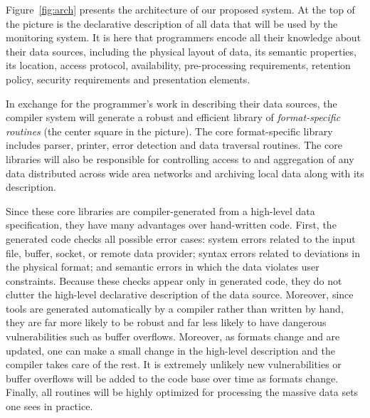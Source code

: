 \documentclass{sigplanconf}
\begin{document}
Figure~\ref{fig:arch} presents the architecture of our proposed
system.  At the top of the picture is the declarative description of all
data that will be used by the monitoring system.  It is here that
programmers encode all their knowledge about their data sources,
including the physical layout of data, its semantic properties,
its location, access protocol, availability, pre-processing requirements,
retention policy, security requirements and presentation elements.

In exchange for the programmer's work in describing their
data sources, the compiler system will generate
a robust and efficient library of {\em format-specific routines} (the center
square in the picture).
The core format-specific 
library includes parser, printer, error detection and data traversal
routines.  The core libraries will also be responsible for controlling
access to and aggregation of any data distributed across wide area
networks and archiving local data along with its description.  

Since these core libraries are compiler-generated from a
high-level data specification, they have many advantages over
hand-written code.  First, the generated code checks
all possible error cases: system errors related to the input file,
buffer, socket, or remote data provider; 
syntax errors related to deviations in the physical
format; and semantic errors in which the data violates user
constraints.  Because these checks appear only in generated code, they
do not clutter the high-level declarative description of the data
source.  Moreover, since tools are generated
automatically by a compiler rather than written by hand, 
they are far more likely to be robust
and far less likely to have dangerous vulnerabilities such as
buffer overflows.  Moreover, as formats change and are updated,
one can make a small change in the high-level description
and the compiler takes care of the rest.  It is extremely unlikely
new vulnerabilities or buffer overflows will be added to the code
base over time as formats change.  Finally, all routines will
be highly optimized for processing the massive
data sets one sees in practice.
\end{document}
